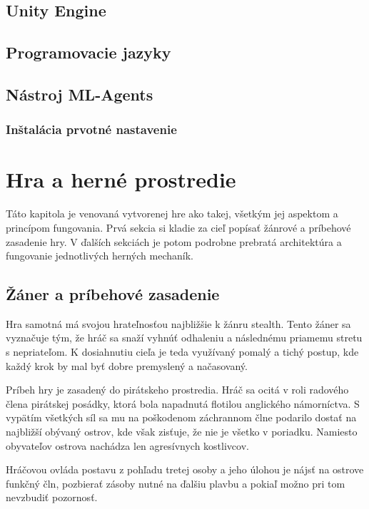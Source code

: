 \documentclass[slovak, master]{diploma}
\begin{document}
\section{Unity Engine}
\label{sec:Unity}
\section{Programovacie jazyky}
\label{sec:langs}
\section{Nástroj ML-Agents}
\label{sec:ML-Agents}
\subsection{Inštalácia prvotné nastavenie}
\label{sec:MLAgentsInstall}

\chapter{Hra a herné prostredie}
\label{sec:GameOverview}
Táto kapitola je venovaná vytvorenej hre ako takej, všetkým jej aspektom a princípom fungovania. Prvá sekcia si kladie za cieľ popísať žánrové a príbehové zasadenie hry. V ďalších sekciách je potom podrobne prebratá architektúra a fungovanie jednotlivých herných mechaník.

\section{Žáner a príbehové zasadenie}
\label{sec:GenreAndSetting}
Hra samotná má svojou hrateľnosťou najbližšie k žánru stealth. Tento žáner sa vyznačuje tým, že hráč sa snaží vyhnúť odhaleniu a následnému priamemu stretu s nepriateľom. K dosiahnutiu cieľa je teda využívaný pomalý a tichý postup, kde každý krok by mal byť dobre premyslený a načasovaný. 

Príbeh hry je zasadený do pirátskeho prostredia. Hráč sa ocitá v roli radového člena pirátskej posádky, ktorá bola napadnutá flotilou anglického námorníctva. S vypätím všetkých síl sa mu na poškodenom záchrannom člne podarilo dostať na najbližší obývaný ostrov, kde však zisťuje, že nie je všetko v poriadku. Namiesto obyvateľov ostrova nachádza len agresívnych kostlivcov. 

Hráčovou ovláda postavu z pohľadu tretej osoby a jeho úlohou je nájsť na ostrove funkčný čln, pozbierať zásoby nutné na ďalšiu plavbu a pokiaľ možno pri tom nevzbudiť pozornosť.
\end{document}
